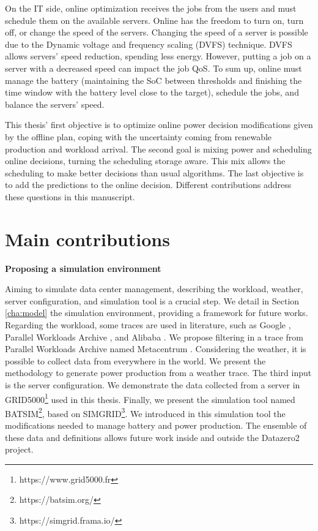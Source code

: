 On the IT side, online optimization receives the jobs from the users and must schedule them on the available servers. Online has the freedom to turn on, turn off, or change the speed of the servers. Changing the speed of a server is possible due to the Dynamic voltage and frequency scaling (DVFS) technique. DVFS allows servers' speed reduction, spending less energy. However, putting a job on a server with a decreased speed can impact the job QoS. To sum up, online must manage the battery (maintaining the SoC between thresholds and finishing the time window with the battery level close to the target), schedule the jobs, and balance the servers' speed.

This thesis' first objective is to optimize online power decision modifications given by the offline plan, coping with the uncertainty coming from renewable production and workload arrival. The second goal is mixing power and scheduling online decisions, turning the scheduling storage aware. This mix allows the scheduling to make better decisions than usual algorithms. The last objective is to add the predictions to the online decision. Different contributions address these questions in this manuscript.


\section{Main contributions}
\begin{center}
    \textbf{Proposing a simulation environment}
\end{center}
Aiming to simulate data center management, describing the workload, weather, server configuration, and simulation tool is a crucial step. We detail in Section \ref{cha:model} the simulation environment, providing a framework for future works. Regarding the workload, some traces are used in literature, such as Google \cite{reiss2011google}, Parallel Workloads Archive \cite{feitelson2014experience}, and Alibaba \cite{wang2022characterizing}. We propose filtering in a trace from Parallel Workloads Archive named Metacentrum \cite{klusavcek2017real}. Considering the weather, it is possible to collect data from everywhere in the world. We present the methodology to generate power production from a weather trace. The third input is the server configuration. We demonstrate the data collected from a server in GRID5000\footnote{https://www.grid5000.fr} used in this thesis. Finally, we present the simulation tool named BATSIM\footnote{https://batsim.org/}, based on SIMGRID\footnote{https://simgrid.frama.io/}. We introduced in this simulation tool the modifications needed to manage battery and power production. The ensemble of these data and definitions allows future work inside and outside the Datazero2 project.

